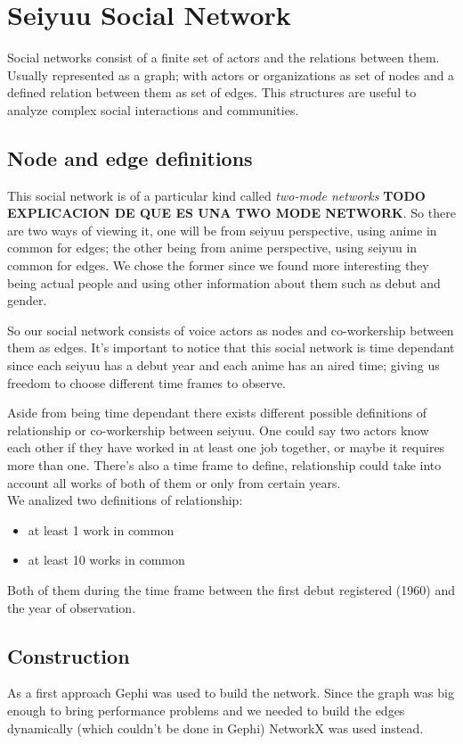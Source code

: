 \chapter{Seiyuu Social Network}
Social networks consist of a finite set of actors and the relations between them. Usually represented as a graph; with actors or organizations as set of nodes and a defined relation between them as set of edges. This structures are useful to analyze complex social interactions and communities.

\section{Node and edge definitions}
This social network is of a particular kind called \textit{two-mode networks}
\textbf{TODO EXPLICACION DE QUE ES UNA TWO MODE NETWORK}. So there are two ways of viewing it, one will be from seiyuu perspective, using anime in common for edges; the other being from anime perspective, using seiyuu in common for edges. We chose the former since we found more interesting they being actual people and using other information about them such as debut and gender.

So our social network consists of voice actors as nodes and co-workership between them as edges. It's important to notice that this social network is time dependant since each seiyuu has a debut year and each anime has an aired time; giving us freedom to choose different time frames to observe.

Aside from being time dependant there exists different possible definitions of relationship or co-workership between seiyuu. One could say two actors know each other if they have worked in at least one job together, or maybe it requires more than one. There's also a time frame to define, relationship could take into account all works of both of them or only from certain years.\\

We analized two definitions of relationship:
\begin{itemize}
\item at least 1 work in common
\item at least 10 works in common
\end{itemize}
Both of them during the time frame between the first debut registered (1960) and the year of observation.

\section{Construction}
As a first approach Gephi was used to build the network. Since the graph was big enough to bring performance problems and we needed to build the edges dynamically (which couldn't be done in Gephi) NetworkX was used instead.

